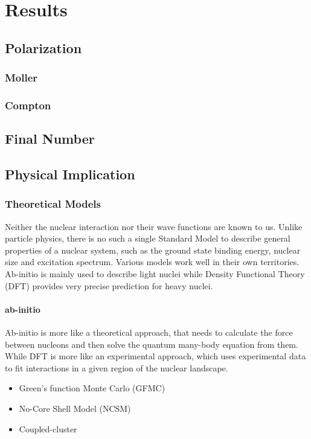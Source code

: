 \chapter{Results}

\section{Polarization}
\subsection{Moller}
\subsection{Compton}

\section{Final Number}
\begin{table}
    \centering
\end{table}

\section{Physical Implication}

\subsection{Theoretical Models}
Neither the nuclear interaction nor their wave functions are known to us.
Unlike particle physics, there is no such a single Standard Model to describe
general properties of a nuclear system, such as the ground state binding energy,
nuclear size and excitation spectrum. Various models work well in their own
territories. Ab-initio is mainly used to describe light nuclei while Density
Functional Theory (DFT) provides very precise prediction for heavy nuclei.

\subsubsection{ab-initio}
Ab-initio is more like a theoretical approach, that needs to calculate the force
between nucleons and then solve the quantum many-body equation from them. While
DFT is more like an experimental approach, which uses experimental data to fit
interactions in a given region of the nuclear landscape.
\begin{itemize}
    \item Green's function Monte Carlo (GFMC)
    \item No-Core Shell Model (NCSM)
    \item Coupled-cluster
\end{itemize}
